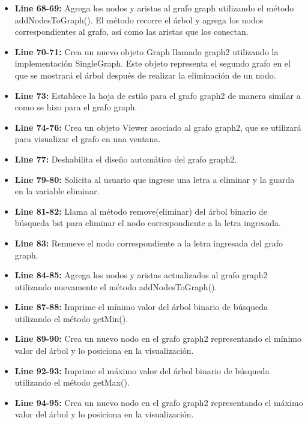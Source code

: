 \documentclass{article}
\begin{document}
\begin{itemize}
\begin{itemize}
\begin{itemize}
	\item Si no se produce una excepción, se inserta el carácter junto con un sufijo numérico en el árbol utilizando el método insert().
	\item Si se produce una excepción ExceptionNoFound, se captura y se imprime la traza de la excepción.
	\end{itemize}
	\item \textbf{Line 68-69:} Agrega los nodos y aristas al grafo graph utilizando el método addNodesToGraph(). El método recorre el árbol y agrega los nodos correspondientes al grafo, así como las aristas que los conectan.
	\item \textbf{Line 70-71:} Crea un nuevo objeto Graph llamado graph2 utilizando la implementación SingleGraph. Este objeto representa el segundo grafo en el que se mostrará el árbol después de realizar la eliminación de un nodo.
	\item \textbf{Line 73:} Establece la hoja de estilo para el grafo graph2 de manera similar a como se hizo para el grafo graph.
	\item \textbf{Line 74-76:} Crea un objeto Viewer asociado al grafo graph2, que se utilizará para visualizar el grafo en una ventana.
	\item \textbf{Line 77:} Deshabilita el diseño automático del grafo graph2.
	\item \textbf{Line 79-80:} Solicita al usuario que ingrese una letra a eliminar y la guarda en la variable eliminar.
	\item \textbf{Line 81-82:} Llama al método remove(eliminar) del árbol binario de búsqueda bst para eliminar el nodo correspondiente a la letra ingresada.
	\item \textbf{Line 83:} Remueve el nodo correspondiente a la letra ingresada del grafo graph.
	\item \textbf{Line 84-85:} Agrega los nodos y aristas actualizados al grafo graph2 utilizando nuevamente el método addNodesToGraph().
	\item \textbf{Line 87-88:} Imprime el mínimo valor del árbol binario de búsqueda utilizando el método getMin().
	\item \textbf{Line 89-90:} Crea un nuevo nodo en el grafo graph2 representando el mínimo valor del árbol y lo posiciona en la visualización.
	\item \textbf{Line 92-93:} Imprime el máximo valor del árbol binario de búsqueda utilizando el método getMax().
	\item \textbf{Line 94-95:} Crea un nuevo nodo en el grafo graph2 representando el máximo valor del árbol y lo posiciona en la visualización.

\end{itemize}
\end{itemize}
\end{document}
